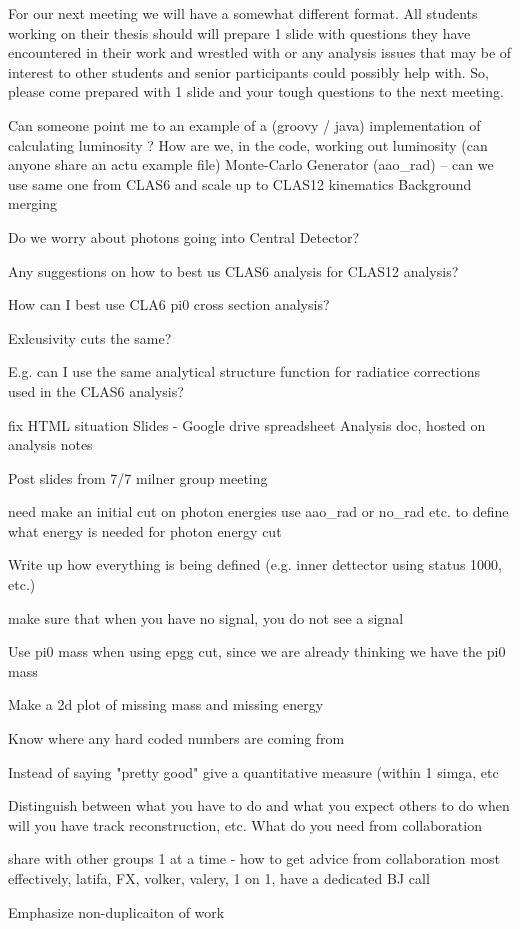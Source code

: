 For our next meeting we will have a somewhat different format. All students working on their thesis should will prepare 1 slide with questions they have encountered in their work and wrestled with or any analysis issues that may be of interest to other students and senior participants could possibly help with.
So, please come prepared with 1 slide and your tough questions to the next meeting.


Can someone point me to an example of a (groovy / java) implementation of calculating luminosity ?
How are we, in the code, working out luminosity (can anyone share an actu example file)
Monte-Carlo
Generator (aao_rad) – can we use same one from CLAS6 and scale up to CLAS12 kinematics
Background merging


Do we worry about photons going into Central Detector?

Any suggestions on how to best us CLAS6 analysis for CLAS12 analysis?

How can I best use CLA6 pi0 cross section analysis?

Exlcusivity cuts the same?

E.g. can I use the same analytical structure function for radiatice corrections used in the CLAS6 analysis?




fix HTML situation
Slides - 
Google drive spreadsheet
Analysis doc, hosted on analysis notes



Post slides from 7/7 milner group meeting

need make an initial cut on photon energies
use aao_rad or no_rad etc. to define what energy is needed for photon energy cut

Write up how everything is being defined (e.g. inner dettector using status 1000, etc.)

make sure that when you have no signal, you do not see a signal

Use pi0 mass when using epgg cut, since we are already thinking we have the pi0 mass

Make a 2d plot of missing mass and missing energy

Know where any hard coded numbers are coming from

Instead of saying "pretty good" give a quantitative measure (within 1 simga, etc

Distinguish between what you have to do and what you expect others to do
when will you have track reconstruction, etc. 
What do you need from collaboration

share with other groups 1 at a time - how to get advice from collaboration most effectively, latifa, FX, volker, valery, 1 on 1, have a dedicated BJ call

Emphasize non-duplicaiton of work